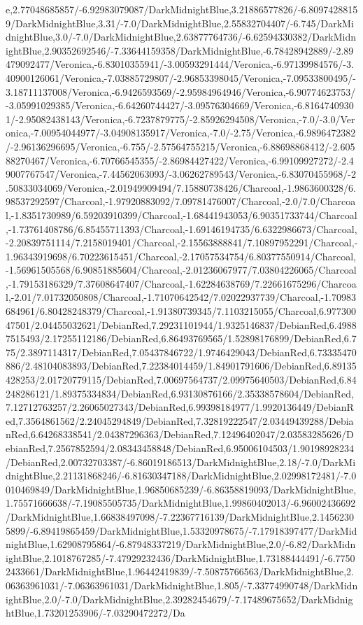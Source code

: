 {\begin{tikzternal}
e,2.77048685857/-6.92983079087/DarkMidnightBlue,3.21886577826/-6.80974288159/DarkMidnightBlue,3.31/-7.0/DarkMidnightBlue,2.55832704407/-6.745/DarkMidnightBlue,3.0/-7.0/DarkMidnightBlue,2.63877764736/-6.62594330382/DarkMidnightBlue,2.90352692546/-7.33644159358/DarkMidnightBlue,-6.78428942889/-2.89479092477/Veronica,-6.83010355941/-3.00593291444/Veronica,-6.97139984576/-3.40900126061/Veronica,-7.03885729807/-2.96853398045/Veronica,-7.09533800495/-3.18711137008/Veronica,-6.9426593569/-2.95984964946/Veronica,-6.90774623753/-3.05991029385/Veronica,-6.64260744427/-3.09576304669/Veronica,-6.81647409301/-2.95082438143/Veronica,-6.7237879775/-2.85926294508/Veronica,-7.0/-3.0/Veronica,-7.00954044977/-3.04908135917/Veronica,-7.0/-2.75/Veronica,-6.9896472382/-2.96136296695/Veronica,-6.755/-2.57564755215/Veronica,-6.88698868412/-2.60588270467/Veronica,-6.70766545355/-2.86984427422/Veronica,-6.99109927272/-2.49007767547/Veronica,-7.44562063093/-3.06262789543/Veronica,-6.83070455968/-2.50833034069/Veronica,-2.01949909494/7.15880738426/Charcoal,-1.9863600328/6.98537292597/Charcoal,-1.97920883092/7.09781476007/Charcoal,-2.0/7.0/Charcoal,-1.8351730989/6.59203910399/Charcoal,-1.68441943053/6.90351733744/Charcoal,-1.73761408786/6.85455711393/Charcoal,-1.69146194735/6.6322986673/Charcoal,-2.20839751114/7.2158019401/Charcoal,-2.15563888841/7.10897952291/Charcoal,-1.96343919698/6.70223615451/Charcoal,-2.17057534754/6.80377550914/Charcoal,-1.56961505568/6.90851885604/Charcoal,-2.01236067977/7.03804226065/Charcoal,-1.79153186329/7.37608647407/Charcoal,-1.62284638769/7.22661675296/Charcoal,-2.01/7.01732050808/Charcoal,-1.71070642542/7.02022937739/Charcoal,-1.70983684961/6.80428248379/Charcoal,-1.91380739345/7.1103215055/Charcoal,6.97730047501/2.04455032621/DebianRed,7.29231101944/1.9325146837/DebianRed,6.49887515493/2.17255112186/DebianRed,6.86493769565/1.52898176899/DebianRed,6.775/2.3897114317/DebianRed,7.05437846722/1.9746429043/DebianRed,6.73335470886/2.48104083893/DebianRed,7.22384014459/1.84901791606/DebianRed,6.89135428253/2.01720779115/DebianRed,7.00697564737/2.09975640503/DebianRed,6.84248286121/1.89375334834/DebianRed,6.93130876166/2.35338578604/DebianRed,7.12712763257/2.26065027343/DebianRed,6.99398184977/1.9920136449/DebianRed,7.3564861562/2.24045294849/DebianRed,7.32819222547/2.03449439288/DebianRed,6.64268338541/2.04387296363/DebianRed,7.12496402047/2.03583285626/DebianRed,7.2567852594/2.08343458848/DebianRed,6.95006104503/1.90198928234/DebianRed,2.00732703387/-6.86019186513/DarkMidnightBlue,2.18/-7.0/DarkMidnightBlue,2.21131868246/-6.81630347188/DarkMidnightBlue,2.02998172481/-7.0010469849/DarkMidnightBlue,1.96850685239/-6.86358819093/DarkMidnightBlue,1.75571666638/-7.19085505735/DarkMidnightBlue,1.99860402013/-6.96002436692/DarkMidnightBlue,1.66838497098/-7.22367716139/DarkMidnightBlue,2.14562305899/-6.89419865459/DarkMidnightBlue,1.53320978675/-7.17918397477/DarkMidnightBlue,1.62908795864/-6.87948337219/DarkMidnightBlue,2.0/-6.82/DarkMidnightBlue,2.1018767285/-7.47929232436/DarkMidnightBlue,1.73188444491/-6.77502433661/DarkMidnightBlue,1.96442419839/-7.50875766563/DarkMidnightBlue,2.06363961031/-7.06363961031/DarkMidnightBlue,1.805/-7.33774990748/DarkMidnightBlue,2.0/-7.0/DarkMidnightBlue,2.39282454679/-7.17489675652/DarkMidnightBlue,1.73201253906/-7.03290472272/Da
\end{tikzternal}}
